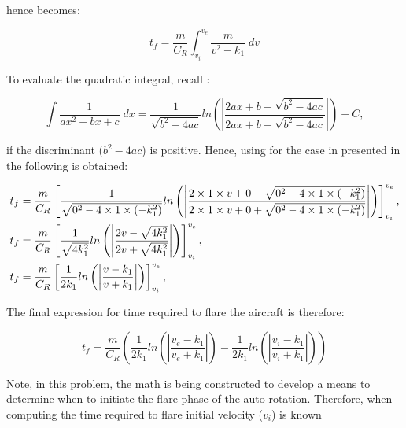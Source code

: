 \documentclass[11pt,a4paper]{article}
\begin{document}
hence  becomes:

\begin{equation}
	\label{eq:TimeInt1}
	t_{f} = \dfrac{m}{C_{R}} \int_{v_{i}}^{v_{e}} \dfrac{m}{v^{2} - k_{1}} \; dv
\end{equation}

To evaluate the quadratic integral, recall \cite{wikiQuadInt, YouMath}:

\begin{equation}
	\label{eq:QuadInt}
	\int \dfrac{1}{a x^{2} + b x + c} \; dx = \dfrac{1}{\sqrt{b^{2} - 4 a c}} ln \left( \left| \dfrac{2 a x + b - \sqrt{b^{2} - 4 a c}}{2 a x + b + \sqrt{b^{2} - 4 a c}} \right| \right) + C, 
\end{equation}

if the discriminant ($b^{2} - 4ac$) is positive.  Hence, using  for the case in presented in  the following is obtained:

\begin{alignat}{2}
	t_{f} &= \dfrac{m}{C_{R}} \left[ \dfrac{1}{\sqrt{0^{2} - 4 \times 1 \times (-k_{1}^{2})}} ln \left( \left| \dfrac{2 \times 1 \times v + 0 - \sqrt{0^{2} - 4 \times 1 \times (-k_{1}^{2})}}{2 \times 1 \times v + 0 + \sqrt{0^{2} - 4 \times 1 \times (-k_{1}^{2})}} \right| \right) \right]_{v_{i}}^{v_{e}}, \notag\\
	t_{f} &= \dfrac{m}{C_{R}} \left[ \dfrac{1}{\sqrt{4 k_{1}^{2}}} ln \left( \left| \dfrac{2 v - \sqrt{4 k_{1}^{2}}}{2 v + \sqrt{4 k_{1}^{2}}} \right| \right) \right]_{v_{i}}^{v_{e}}, \notag\\
	t_{f} &= \dfrac{m}{C_{R}} \left[ \dfrac{1}{2 k_{1}} ln \left( \left| \dfrac{v - k_{1}}{v + k_{1}} \right| \right) \right]_{v_{i}}^{v_{e}}, \label{eq:TimeInt2}
\end{alignat}

The final expression for time required to flare the aircraft is therefore:

\begin{equation}
	t_{f} = \dfrac{m}{C_{R}} \left( \dfrac{1}{2 k_{1}} ln \left( \left| \dfrac{v_{e} - k_{1}}{v_{e} + k_{1}} \right| \right) - \dfrac{1}{2 k_{1}} ln \left( \left| \dfrac{v_{i} - k_{1}}{v_{i} + k_{1}} \right| \right) \right)
\end{equation}

Note, in this problem, the math is being constructed to develop a means to determine when to initiate the flare phase of the auto rotation.  Therefore, when computing the time required to flare  initial velocity ($v_{i}$) is known 



\end{document}
